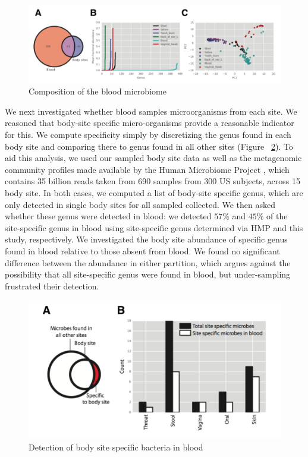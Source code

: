 \begin{figure}
\center\includegraphics[width=150mm,scale=0.5]{Figures/Fig12}
\caption{Composition of the blood microbiome}
\label{fig:Fig12}
\end{figure}

We next investigated whether blood samples microorganisms from each site. We reasoned that body-site specific micro-organisms provide a reasonable indicator for this. We compute specificity simply by discretizing the genus found in each body site and comparing there to genus found in all other sites (Figure ~\ref{fig:Fig13}). To aid this analysis, we used our sampled body site data as well as the metagenomic community profiles made available by the Human Microbiome Project \cite{Consortium:2012bb}, which contains 35 billion reads taken from 690 samples from 300 US subjects, across 15 body site. In both cases, we computed a list of body-site specific genus, which are only detected in single body sites for all sampled collected. We then asked whether these genus were detected in blood: we detected $57$\% and $45$\% of the site-specific genus in blood using site-specific genus determined via HMP and this study, respectively. We investigated the body site abundance of specific genus found in blood relative to those absent from blood. We found no significant difference between the abundance in either partition, which argues against the possibility that all site-specific genus were found in blood, but under-sampling frustrated their detection.

\begin{figure}
\center\includegraphics[width=150mm,scale=0.5]{Figures/Fig13}
\caption{Detection of body site specific bacteria in blood}
\label{fig:Fig13}
\end{figure}

